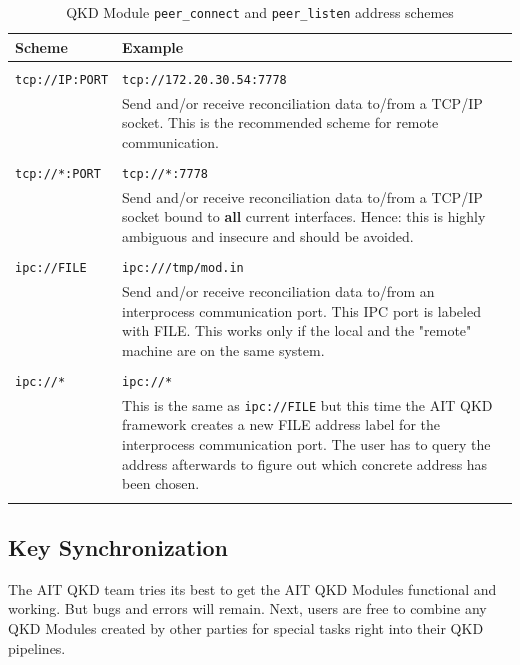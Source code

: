 \begin{table}[h]
    \begin{tabular}{lp{11cm}}
    Scheme                  &   Example \\
    \hline
    \\
    \texttt{tcp://IP:PORT}  &   \texttt{tcp://172.20.30.54:7778} \\ [0.7em]
    & Send and/or receive reconciliation data to/from a TCP/IP socket. This is the recommended scheme for remote communication.\\ [0.7em]    
    \\
    \texttt{tcp://*:PORT}   &   \texttt{tcp://*:7778}            \\ [0.7em]
    & Send and/or receive reconciliation data to/from a TCP/IP socket bound to \textbf{all} current interfaces. Hence: this is highly ambiguous and insecure and should be avoided.\\ [0.7em]    
    \\
    \texttt{ipc://FILE}     &   \texttt{ipc:///tmp/mod.in}       \\ [0.7em]
    & Send and/or receive reconciliation data to/from an interprocess communication port. This IPC port is labeled with FILE. This works only if the local and the "remote" machine are on the same system.\\ [0.7em]    
    \\
    \texttt{ipc://*}        &   \texttt{ipc://*}                 \\ [0.7em]
    & This is the same as \texttt{ipc://FILE} but this time the AIT QKD framework creates a new FILE address label for the interprocess communication port. The user has to query the address afterwards to figure out which concrete address has been chosen.\\ [0.7em]    
    \\
    \end{tabular}
    \caption{QKD Module \texttt{peer\_connect} and \texttt{peer\_listen} address schemes}
    \label{tab:QKD Module peer-connect and peer-listen address schemes}
\end{table}


\subsection{Key Synchronization}
\label{subsec:Key Synchronization}

The AIT QKD team tries its best to get the AIT QKD Modules functional and working. But bugs and errors will remain. Next, users are free to combine any QKD Modules created by other parties for special tasks right into their QKD pipelines.

